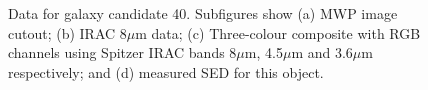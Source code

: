 \documentclass[times,usenatbib]{mn2e}
\begin{document}
\begin{figure}
\begin{center}
\caption{Data for galaxy candidate 40. Subfigures show (a) MWP image cutout; (b) IRAC 8$\mu$m data; (c) Three-colour composite with RGB channels using Spitzer IRAC bands 8$\mu$m, 4.5$\mu$m and 3.6$\mu$m respectively; and (d) measured SED for this object.}
\label{gal40}
\end{center}
\end{figure} 
\end{document}
